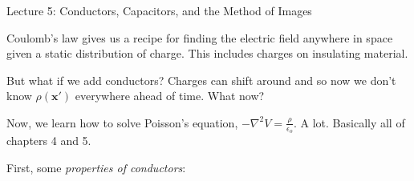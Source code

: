 \documentclass{article}
\begin{document}
\begin{center}
    {\Huge Lecture 5: Conductors, Capacitors, and the Method of Images} \\[0.5cm]
\end{center}

\vspace{1em}

Coulomb's law gives us a recipe for finding the electric field anywhere in space given a static distribution of charge. This includes charges on insulating material.

\vspace{1em}

But what if we add conductors? Charges can shift around and so now we don't know $\rho(\bm{x'})$ everywhere ahead of time. What now?

\vspace{1em}

Now, we learn how to solve Poisson's equation, $\displaystyle -\nabla^2 V = \frac{\rho}{\epsilon_o}$. A lot. Basically all of chapters 4 and 5.

\vspace{1em}

First, some \emph{properties of conductors}:
\end{document}
